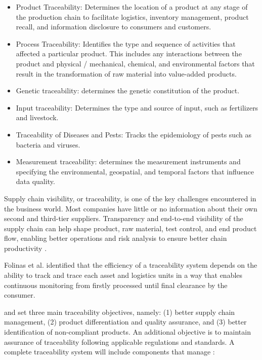 \begin{itemize}
\item Product Traceability: Determines the location of a product at any stage of the production chain to facilitate logistics, inventory management, product recall, and information disclosure to consumers and customers.
\item Process Traceability: Identifies the type and sequence of activities that affected a particular product. This includes any interactions between the product and physical / mechanical, chemical, and environmental factors that result in the transformation of raw material into value-added products.
\item Genetic traceability: determines the genetic constitution of the product.
\item Input traceability: Determines the type and source of input, such as fertilizers and livestock.
\item Traceability of Diseases and Pests: Tracks the epidemiology of pests such as bacteria and viruses.
\item Measurement traceability: determines the measurement instruments and specifying the environmental, geospatial, and temporal factors that influence data quality.
\end{itemize}

Supply chain visibility, or traceability,  is one of the key challenges encountered in the business world. Most companies have little or no information about their own second and third-tier suppliers. Transparency and end-to-end visibility of the supply chain can help shape product, raw material, test control, and end product flow, enabling better operations and risk analysis to ensure better chain productivity \cite{abeyratne2016blockchain}.

Folinas et al. \cite{folinas2006traceability} identified that the efficiency of a traceability system depends on the ability to track and trace each asset and logistics units in a way that enables continuous monitoring from firstly processed until final clearance by the consumer.

 and  set three main traceability objectives, namely: (1) better supply chain management, (2) product differentiation and quality assurance, and (3) better identification of non-compliant products. An additional objective is to maintain assurance of traceability following applicable regulations and standards. A complete traceability system will include components that manage \cite{vargas2017trazabilidad}:

